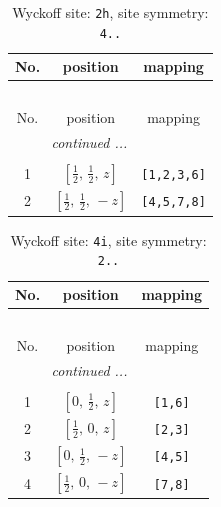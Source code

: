 \documentclass[fleqn,8pt]{jsarticle}
\begin{document}
\begin{longtable}{ccc}
\caption{Wyckoff site: {\tt 2h}, site symmetry: {\tt 4..}}
 \\
 \hline \hline
No. & position & mapping \\ \hline \endfirsthead

\multicolumn{2}{l}{\tablename\ \thetable{}} \\
 \hline \hline
No. & position & mapping \\ \hline \endhead

 \hline \hline
\multicolumn{2}{r}{\footnotesize\it continued ...} \\ \endfoot

 \hline \hline
\multicolumn{2}{r}{} \\ \endlastfoot

1 & $\left[ \frac{1}{2},\, \frac{1}{2},\, z \right]$ & {\tt [1,2,3,6]} \\ \hline
2 & $\left[ \frac{1}{2},\, \frac{1}{2},\, - z \right]$ & {\tt [4,5,7,8]} \\
\end{longtable}
\renewcommand{\arraystretch}{1.2}
\begin{longtable}{ccc}
\caption{Wyckoff site: {\tt 4i}, site symmetry: {\tt 2..}}
 \\
 \hline \hline
No. & position & mapping \\ \hline \endfirsthead

\multicolumn{2}{l}{\tablename\ \thetable{}} \\
 \hline \hline
No. & position & mapping \\ \hline \endhead

 \hline \hline
\multicolumn{2}{r}{\footnotesize\it continued ...} \\ \endfoot

 \hline \hline
\multicolumn{2}{r}{} \\ \endlastfoot

1 & $\left[ 0,\, \frac{1}{2},\, z \right]$ & {\tt [1,6]} \\ \hline
2 & $\left[ \frac{1}{2},\, 0,\, z \right]$ & {\tt [2,3]} \\ \hline
3 & $\left[ 0,\, \frac{1}{2},\, - z \right]$ & {\tt [4,5]} \\ \hline
4 & $\left[ \frac{1}{2},\, 0,\, - z \right]$ & {\tt [7,8]} \\
\end{longtable}
\renewcommand{\arraystretch}{1.2}
\end{document}
